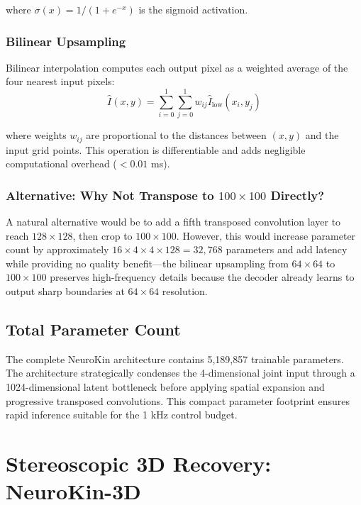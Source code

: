 \documentclass[12pt,a4paper,oneside]{report}
\begin{document}
where $\sigma(x) = 1/(1 + e^{-x})$ is the sigmoid activation.

\subsubsection{Bilinear Upsampling}

Bilinear interpolation computes each output pixel as a weighted average of the four nearest input pixels:
\begin{equation}
\hat{I}(x,y) = \sum_{i=0}^{1}\sum_{j=0}^{1} w_{ij} \hat{I}_{\text{low}}(x_i, y_j)
\end{equation}

where weights $w_{ij}$ are proportional to the distances between $(x,y)$ and the input grid points. This operation is differentiable and adds negligible computational overhead ($<0.01$ ms).

\subsubsection{Alternative: Why Not Transpose to $100 \times 100$ Directly?}

A natural alternative would be to add a fifth transposed convolution layer to reach $128 \times 128$, then crop to $100 \times 100$. However, this would increase parameter count by approximately $16 \times 4 \times 4 \times 128 = 32,768$ parameters and add latency while providing no quality benefit—the bilinear upsampling from $64 \times 64$ to $100 \times 100$ preserves high-frequency details because the decoder already learns to output sharp boundaries at $64 \times 64$ resolution.

\subsection{Total Parameter Count}

The complete NeuroKin architecture contains 5,189,857 trainable parameters. The architecture strategically condenses the 4-dimensional joint input through a 1024-dimensional latent bottleneck before applying spatial expansion and progressive transposed convolutions. This compact parameter footprint ensures rapid inference suitable for the 1 kHz control budget.

\section{Stereoscopic 3D Recovery: NeuroKin-3D}
\end{document}
